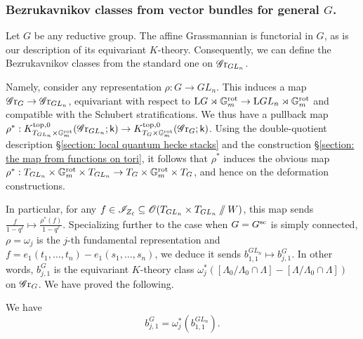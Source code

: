 \subsubsection{Bezrukavnikov classes from vector bundles for general $G$.}
Let $G$ be any reductive group.
The affine Grassmannian is functorial in $G$, as is our description of its equivariant $K$-theory. Consequently, we can define the Bezrukavnikov classes from the standard one on $\Gr_{GL_n}$.

Namely, consider any representation $\rho: G \to GL_n$. This induces a map $\Gr_G \to \Gr_{GL_n}$, equivariant with respect to $\lo G \rtimes \Gm^{\rot} \to \lo GL_n \rtimes \Gm^{\rot}$ and compatible with the Schubert stratifications.
We thus have a pullback map $\rho^*: K^{\top, 0}_{T_{GL_n} \times \Gm^{\rot}}(\Gr_{GL_n}; \k) \to K_{T_{G} \times \Gm^{\rot}}^{\top, 0}(\Gr_G; \k)$. Using the double-quotient description \S \ref{section: local quantum hecke stacks} and the construction \S \ref{section: the map from functions on tori}, it follows that $\rho^*$ induces the obvious map $\rho^*: T_{GL_n} \times \Gm^{\rot} \times T_{GL_n} \to T_{G} \times \Gm^{\rot} \times T_{G}$, and hence on the deformation constructions.


In particular, for any $f \in \eI_{Z_{\ell}} \subseteq \O(T_{GL_n} \times T_{GL_n} \sslash W)$, this map sends $\tfrac{f}{1-q^{\ell}} \mapsto \tfrac{\rho^*(f)}{1-q^{\ell}}$. 
Specializing further to the case when $G=G^{\sc}$ is simply connected, $\rho = \omega_j$ is the $j$-th fundamental representation and $f=e_1(t_1, \dots, t_n) - e_1(s_1, \dots, s_n)$, we deduce it sends $b^{GL_n}_{1,1} \mapsto b^G_{j, 1}$. In other words, $b^G_{j, 1}$ is the equivariant $K$-theory class $\omega_j^*([\Lambda_0 / \Lambda_0 \cap \Lambda] - [\Lambda / \Lambda_0 \cap \Lambda] )$ on $\Gr_{G}$. We have proved the following.

\begin{lemma}\label{lemma: fundamental bezrukavnikov classes as pullbacks} We have
 \begin{equation*}
    b^G_{j,1}= \omega_j^{*} (b^{GL_n}_{1,1}). 
 \end{equation*}   
\end{lemma}

